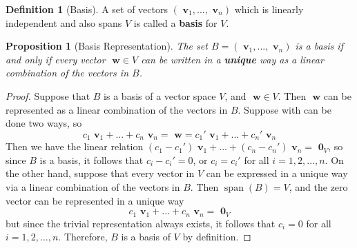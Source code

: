 \documentclass[12pt]{article}
\newtheorem{prop}[thm]{Proposition}
\theoremstyle{definition}
\newtheorem{defn}[thm]{Definition}
\theoremstyle{remark}
\numberwithin{equation}{section}
\newcommand\B[1]{\textbf{ #1}}
\DeclareMathOperator{\spn}{span}
\begin{document}
\vspace{15pt}

\begin{defn}[Basis]
        A set of vectors $(\B{v}_1,...,\B{v}_n)$ which is linearly independent and also spans $V$ is called a \B{basis} for $V$.
\end{defn}

\vspace{15pt}

\begin{prop}[Basis Representation]
        The set $B = (\B{v}_1,...,\B{v}_n)$ is a basis if and only if every vector $\B{w} \in V$ can be written in a \B{unique} way as a linear combination of the vectors in $B$.
\end{prop}
\begin{proof}
        Suppose that $B$ is a basis of a vector space $V$, and $\B{w} \in V$. Then $\B{w}$ can be represented as a linear combination of the vectors in $B$. Suppose with can be done two ways, so \begin{equation*}
                c_1\B{v}_1+...+c_n\B{v}_n = \B{w} = c_1'\B{v}_1+...+c_n'\B{v}_n
        \end{equation*}
        Then we have the linear relation $(c_1 - c_1')\B{v}_1 + ... + (c_n - c_n')\B{v}_n = \B{0}_V$, so since $B$ is a basis, it follows that $c_i - c_i' = 0$, or $c_i = c_i'$ for all $i = 1,2,...,n$. On the other hand, suppose that every vector in $V$ can be expressed in a unique way via a linear combination of the vectors in $B$. Then $\spn(B) = V$, and the zero vector can be represented in a unique way \begin{equation*}
                c_1\B{v}_1+...+c_n\B{v}_n = \B{0}_V
        \end{equation*}
        but since the trivial representation always exists, it follows that $c_i = 0$ for all $i = 1,2,...,n$. Therefore, $B$ is a basis of $V$ by definition.
\end{proof}


\vspace{15pt}
\end{document}
